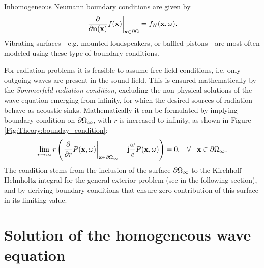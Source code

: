 \begin{itemize}
Inhomogeneous Neumann boundary conditions are given by
\begin{equation}
\left. \frac{\partial}{\partial \mathbf{n}(\mathbf{x})} f(\mathbf{x}) \right|_{\mathbf{x} \in \partial \Omega}= f_N(\mathbf{x},\omega).
\end{equation}
Vibrating surfaces---e.g. mounted loudspeakers, or baffled pistons---are most often modeled using these type of boundary conditions.
\end{itemize}

For radiation problems it is feasible to assume free field conditions, i.e. only outgoing waves are present in the sound field. 
This is ensured mathematically by the \emph{Sommerfeld radiation condition}, excluding the non-physical solutions of the wave equation emerging from infinity, for which the desired sources of radiation behave as acoustic sinks.
Mathematically it can be formulated by implying boundary condition on $\partial \Omega_{\infty}$, with $r$ is increased to infinity, as shown in Figure \ref{Fig:Theory:bounday_condition}:
\begin{equation}
\lim_{r \rightarrow \infty} r \left( \left. \frac{\partial}{\partial r}P(\mathbf{x},\omega)\right|_{\mathbf{x} \in \partial \Omega_{\infty}} +\mathrm{j} \frac{\omega}{c}P(\mathbf{x},\omega) \right) = 0, \hspace{3mm} \forall \hspace{3mm} \mathbf{x} \in \partial \Omega_{\infty}.
\label{Eq:Theory:Sommerfeld_radiation_condition}
\end{equation}
The condition stems from the inclusion of the surface $\partial \Omega_{\infty}$ to the Kirchhoff-Helmholtz integral for the general exterior problem (see in the following section), and by deriving boundary conditions that ensure zero contribution of this surface in its limiting value\cite{Schot1992:Eighty_years, Williams1999}.

%
%
%
%
%
%
%
%
%
%
%
%
\newpage
\section{Solution of the homogeneous wave equation}

